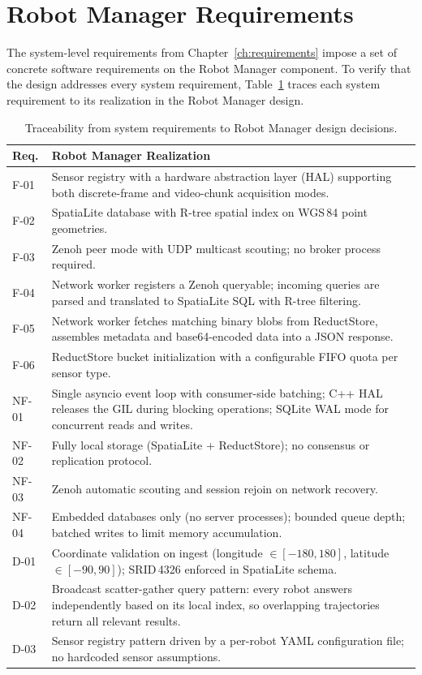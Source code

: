 \section{Robot Manager Requirements} \label{sec:robot-manager-requirements}

The system-level requirements from Chapter~\ref{ch:requirements} impose a set of concrete software requirements on the Robot Manager component. To verify that the design addresses every system requirement, Table~\ref{tab:rm-requirements-traceability} traces each system requirement to its realization in the Robot Manager design.

\begin{table}[htbp]
\centering
\caption{Traceability from system requirements to Robot Manager design decisions.}
\label{tab:rm-requirements-traceability}
\begin{tabular}{l p{10cm}}
\hline
\textbf{Req.} & \textbf{Robot Manager Realization} \\
\hline
F-01 & Sensor registry with a hardware abstraction layer (HAL) supporting both discrete-frame and video-chunk acquisition modes. \\
F-02 & SpatiaLite database with R-tree spatial index on WGS\,84 point geometries. \\
F-03 & Zenoh peer mode with UDP multicast scouting; no broker process required. \\
F-04 & Network worker registers a Zenoh queryable; incoming queries are parsed and translated to SpatiaLite SQL with R-tree filtering. \\
F-05 & Network worker fetches matching binary blobs from ReductStore, assembles metadata and base64-encoded data into a JSON response. \\
F-06 & ReductStore bucket initialization with a configurable FIFO quota per sensor type. \\
NF-01 & Single asyncio event loop with consumer-side batching; C++ HAL releases the GIL during blocking operations; SQLite WAL mode for concurrent reads and writes. \\
NF-02 & Fully local storage (SpatiaLite + ReductStore); no consensus or replication protocol. \\
NF-03 & Zenoh automatic scouting and session rejoin on network recovery. \\
NF-04 & Embedded databases only (no server processes); bounded queue depth; batched writes to limit memory accumulation. \\
D-01 & Coordinate validation on ingest (longitude $\in [-180, 180]$, latitude $\in [-90, 90]$); SRID\,4326 enforced in SpatiaLite schema. \\
D-02 & Broadcast scatter-gather query pattern: every robot answers independently based on its local index, so overlapping trajectories return all relevant results. \\
D-03 & Sensor registry pattern driven by a per-robot YAML configuration file; no hardcoded sensor assumptions. \\
\hline
\end{tabular}
\end{table}


